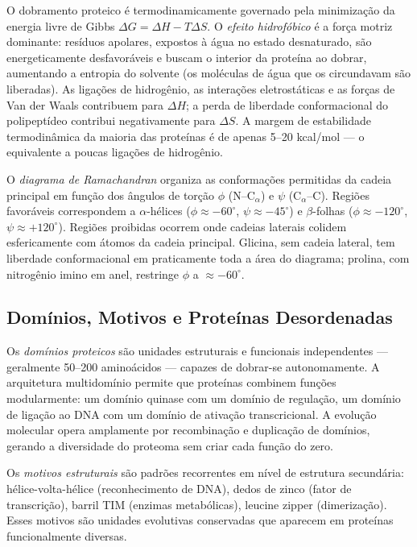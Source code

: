 O dobramento proteico é termodinamicamente governado pela minimização da energia livre de
Gibbs $\Delta G = \Delta H - T\Delta S$. O \emph{efeito hidrofóbico} é a força motriz
dominante: resíduos apolares, expostos à água no estado desnaturado, são energeticamente
desfavoráveis e buscam o interior da proteína ao dobrar, aumentando a entropia do solvente
(os moléculas de água que os circundavam são liberadas). As ligações de hidrogênio, as
interações eletrostáticas e as forças de Van der Waals contribuem para $\Delta H$; a perda
de liberdade conformacional do polipeptídeo contribui negativamente para $\Delta S$. A
margem de estabilidade termodinâmica da maioria das proteínas é de apenas 5--20 kcal/mol
--- o equivalente a poucas ligações de hidrogênio.

O \emph{diagrama de Ramachandran} organiza as conformações permitidas da cadeia principal
em função dos ângulos de torção $\phi$ (N--C$_\alpha$) e $\psi$ (C$_\alpha$--C). Regiões
favoráveis correspondem a $\alpha$-hélices ($\phi \approx -60^\circ$, $\psi \approx -45^\circ$)
e $\beta$-folhas ($\phi \approx -120^\circ$, $\psi \approx +120^\circ$). Regiões proibidas
ocorrem onde cadeias laterais colidem esfericamente com átomos da cadeia principal.
Glicina, sem cadeia lateral, tem liberdade conformacional em praticamente toda a área do
diagrama; prolina, com nitrogênio imino em anel, restringe $\phi$ a $\approx -60^\circ$.

\subsection{Domínios, Motivos e Proteínas Desordenadas}

Os \emph{domínios proteicos} são unidades estruturais e funcionais independentes ---
geralmente 50--200 aminoácidos --- capazes de dobrar-se autonomamente. A arquitetura
multidomínio permite que proteínas combinem funções modularmente: um domínio quinase
com um domínio de regulação, um domínio de ligação ao DNA com um domínio de ativação
transcricional. A evolução molecular opera amplamente por recombinação e duplicação de
domínios, gerando a diversidade do proteoma sem criar cada função do zero.

Os \emph{motivos estruturais} são padrões recorrentes em nível de estrutura secundária:
hélice-volta-hélice (reconhecimento de DNA), dedos de zinco (fator de transcrição),
barril TIM (enzimas metabólicas), leucine zipper (dimerização). Esses motivos são unidades
evolutivas conservadas que aparecem em proteínas funcionalmente diversas.

